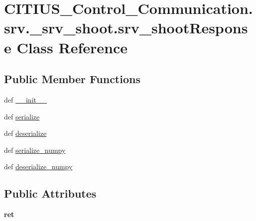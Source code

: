 \hypertarget{class_c_i_t_i_u_s___control___communication_1_1srv_1_1__srv__shoot_1_1srv__shoot_response}{\section{\-C\-I\-T\-I\-U\-S\-\_\-\-Control\-\_\-\-Communication.\-srv.\-\_\-srv\-\_\-shoot.\-srv\-\_\-shoot\-Response \-Class \-Reference}
\label{class_c_i_t_i_u_s___control___communication_1_1srv_1_1__srv__shoot_1_1srv__shoot_response}
}
\subsection*{\-Public \-Member \-Functions}
\begin{DoxyCompactItemize}
\item 
def \hyperlink{class_c_i_t_i_u_s___control___communication_1_1srv_1_1__srv__shoot_1_1srv__shoot_response_a6d4dff3e4c7b2fd42bc5baea30c71beb}{\-\_\-\-\_\-init\-\_\-\-\_\-}
\item 
def \hyperlink{class_c_i_t_i_u_s___control___communication_1_1srv_1_1__srv__shoot_1_1srv__shoot_response_aedacdf89e30b667262f6649f21978a1d}{serialize}
\item 
def \hyperlink{class_c_i_t_i_u_s___control___communication_1_1srv_1_1__srv__shoot_1_1srv__shoot_response_aea8e13306ff372795300520bb27f6246}{deserialize}
\item 
def \hyperlink{class_c_i_t_i_u_s___control___communication_1_1srv_1_1__srv__shoot_1_1srv__shoot_response_a988a4417f948a4347f176e55542db4d2}{serialize\-\_\-numpy}
\item 
def \hyperlink{class_c_i_t_i_u_s___control___communication_1_1srv_1_1__srv__shoot_1_1srv__shoot_response_a99651846a9a5ef94cb11229285ec8278}{deserialize\-\_\-numpy}
\end{DoxyCompactItemize}
\subsection*{\-Public \-Attributes}
\begin{DoxyCompactItemize}
\item 
\hypertarget{class_c_i_t_i_u_s___control___communication_1_1srv_1_1__srv__shoot_1_1srv__shoot_response_a385b8dc3d8fb5272cbbad80b320f7d84}{{\bfseries ret}}\label{class_c_i_t_i_u_s___control___communication_1_1srv_1_1__srv__shoot_1_1srv__shoot_response_a385b8dc3d8fb5272cbbad80b320f7d84}

\end{DoxyCompactItemize}
